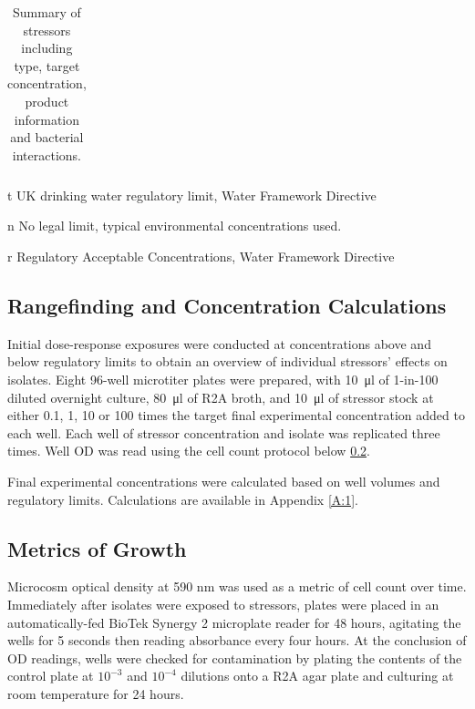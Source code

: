 \documentclass[final,1p,times]{elsarticle}
\begin{document}
\begin{landscape}
\begin{table}[ht]
\begin{threeparttable}
\begin{tabular}{l M l M L L c}
\bottomrule
\end{tabular}
\caption{Summary of stressors including type, target concentration, product information and bacterial interactions.}
\label{tab:stressors}
\begin{tablenotes}
\item [t] UK drinking water regulatory limit, Water Framework Directive
\item [n] No legal limit, typical environmental concentrations used.
\item [r] Regulatory Acceptable Concentrations, Water Framework Directive 
\end{tablenotes}
\end{threeparttable}
\end{table}
\end{landscape}


\subsection{Rangefinding and Concentration Calculations}
\label{S:2:3}

Initial dose-response exposures were conducted at concentrations above and below regulatory limits to obtain an overview of individual stressors' effects on isolates. Eight 96-well microtiter plates were prepared, with  \SI{10}{\ul} of 1-in-100 diluted overnight culture, \SI{80}{\ul} of R2A broth, and \SI{10}{\ul} of stressor stock at either 0.1, 1, 10 or 100 times the target final experimental concentration added to each well. Each well of stressor concentration and isolate was replicated three times. Well OD was read using the cell count protocol below  \ref{S:2:4}.

Final experimental concentrations were calculated based on well volumes and regulatory limits. Calculations are available in Appendix \ref{A:1}.

\subsection{Metrics of Growth}
\label{S:2:4}

Microcosm optical density at 590 nm was used as a metric of cell count over time. Immediately after isolates were exposed to stressors, plates were placed in an automatically-fed BioTek Synergy 2 microplate reader for 48 hours, agitating the wells for 5 seconds then reading absorbance every four hours.  At the conclusion of OD readings, wells were checked for contamination by plating the contents of the control plate at $10^{-3}$ and $10^{-4}$ dilutions onto a R2A agar plate and culturing at room temperature for 24 hours.
\end{document}
